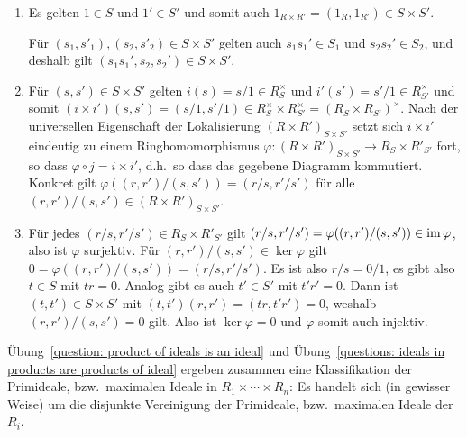 \begin{solution}
  \begin{enumerate}
    \item
      Es gelten $1 \in S$ und $1' \in S'$ und somit auch $1_{R \times R'} = (1_R, 1_{R'}) \in S \times S'$.
      
      Für $(s_1, s'_1), (s_2, s'_2) \in S \times S'$ gelten auch $s_1 s_1' \in S_1$ und $s_2 s_2' \in S_2$, und deshalb gilt $(s_1 s_1', s_2, s_2') \in S \times S'$.
      
    \item
      Für $(s, s') \in S \times S'$ gelten $i(s) = s/1 \in R_S^\times$ und $i'(s') = s'/1 \in R_{S'}^\times$ und somit $(i \times i')(s,s') = (s/1, s'/1) \in R_S^\times \times R_{S'}^\times = (R_S \times R_{S'})^\times$.
      Nach der universellen Eigenschaft der Lokalisierung $(R \times R')_{S \times S'}$ setzt sich $i \times i'$ eindeutig zu einem Ringhomomorphismus $\varphi \colon (R \times R')_{S \times S'} \to R_S \times R'_{S'}$ fort, so dass $\varphi \circ j = i \times i'$, d.h.\ so dass das gegebene Diagramm kommutiert.
      Konkret gilt $\varphi((r,r')/(s,s')) = (r/s, r'/s')$ für alle $(r,r')/(s,s') \in (R \times R')_{S \times S'}$.
      
    \item
      Für jedes $(r/s, r'/s') \in R_S \times R'_{S'}$ gilt $(r/s, r'/s') = \varphi((r,r')/(s,s')) \in \operatorname{im} \varphi$, also ist $\varphi$ surjektiv.
      Für $(r,r')/(s,s') \in \ker \varphi$ gilt $0 = \varphi((r,r')/(s,s')) = (r/s, r'/s')$.
      Es ist also $r/s = 0/1$, es gibt also $t \in S$ mit $tr = 0$.
      Analog gibt es auch $t' \in S'$ mit $t'r' = 0$.
      Dann ist $(t,t') \in S \times S'$ mit $(t,t')(r,r') = (tr,t'r') = 0$, weshalb $(r,r')/(s,s') = 0$ gilt.
      Also ist $\ker \varphi = 0$ und $\varphi$ somit auch injektiv.
  \end{enumerate}
\end{solution}


\begin{remark*}
  Übung~\ref{question: product of ideals is an ideal} und Übung~\ref{questions: ideals in products are products of ideal} ergeben zusammen eine Klassifikation der Primideale, bzw.\ maximalen Ideale in $R_1 \times \dotsb \times R_n$:
  Es handelt sich (in gewisser Weise) um die disjunkte Vereinigung der Primideale, bzw.\ maximalen Ideale der $R_i$.
\end{remark*}


